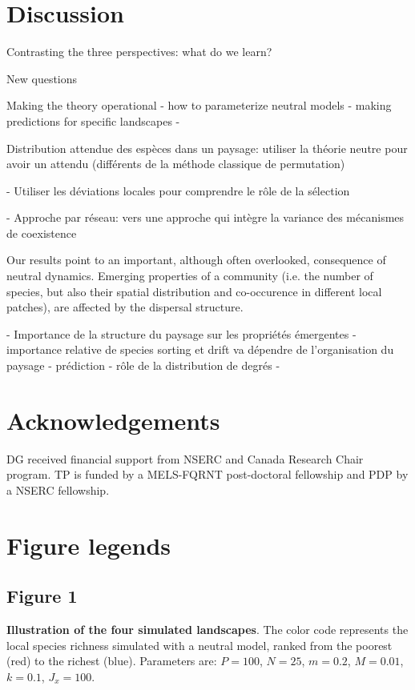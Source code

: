 \documentclass[12pt]{article}
\begin{document}
\section{Discussion}

Contrasting the three perspectives: what do we learn?

New questions

Making the theory operational
	- how to parameterize neutral models
	- making predictions for specific landscapes
	- 


Distribution attendue des espèces dans un paysage: utiliser la théorie neutre pour avoir un attendu (différents de la méthode classique de permutation)

- Utiliser les déviations locales pour comprendre le rôle de la sélection 

- Approche par réseau: vers une approche qui intègre la variance des mécanismes de coexistence

Our results point to an important, although often overlooked, consequence of
neutral dynamics. Emerging properties of a community (i.e. the number of
species, but also their spatial distribution and co-occurence in different local
patches), are affected by the dispersal structure. 

- Importance de la structure du paysage sur les propriétés émergentes
	- importance relative de species sorting et drift va dépendre de l'organisation du paysage
	- prédiction
	- rôle de la distribution de degrés
- 

\section{Acknowledgements}
DG received financial support from NSERC and Canada Research Chair program. TP
is funded by a MELS-FQRNT post-doctoral fellowship and PDP by a NSERC
fellowship.
\newpage

\printbibliography

\newpage
\section*{Figure legends}

\subsection*{Figure 1}
\textbf{Illustration of the four simulated landscapes}. The color code
represents the local species richness simulated with a neutral model, ranked
from the poorest (red) to the richest (blue). Parameters are: $P = 100$, $N =
25$, $m = 0.2$, $M = 0.01$, $k = 0.1$, $J_x = 100$.
\end{document}
